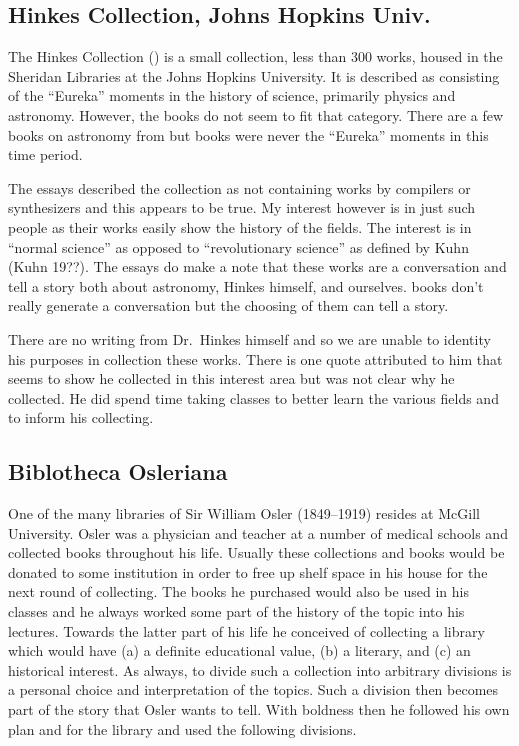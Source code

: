 \documentclass[letterpaper]{article}
\begin{document}
\subsection{Hinkes Collection, Johns Hopkins Univ.}

The Hinkes Collection (\cite{Havens2011}) is a small collection, less
than 300 works, housed in the Sheridan Libraries at the Johns Hopkins
University. It is described as consisting of the ``Eureka'' moments in
the history of science, primarily physics and astronomy. However,
the  books do not seem to fit that category. There are a few
books on astronomy from  but books were never the ``Eureka''
moments in this time period.

The essays described the collection as not containing works by
compilers or synthesizers and this appears to be true.  My interest
however is in just such people as their works easily show the history
of the fields.  The interest is in ``normal science'' as opposed to
``revolutionary science'' as defined by Kuhn (Kuhn 19??). The essays
do make a note that these works are a conversation and tell a story
both about astronomy, Hinkes himself, and ourselves.   books
don't really generate a conversation but the choosing of them can
tell a story.

There are no writing from Dr.~Hinkes himself and so we are unable to
identity his purposes in collection these works.  There is one quote
attributed to him that seems to show he collected in this interest
area but was not clear why he collected.  He did spend time taking
classes to better learn the various fields and to inform his
collecting.


\subsection{Biblotheca Osleriana}

One of the many libraries of Sir William Osler (1849--1919) resides at
McGill University.  Osler was a physician and teacher at a number of
medical schools and collected books throughout his life.  Usually
these collections and books would be donated to some institution in
order to free up shelf space in his house for the next round of
collecting.  The books he purchased would also be used in his classes
and he always worked some part of the history of the topic into his
lectures.  Towards the latter part of his life he conceived of
collecting a library which would have (a) a definite educational
value, (b) a literary, and (c) an historical interest. As always, to
divide such a collection into arbitrary divisions is a personal choice
and interpretation of the topics.  Such a division then becomes part
of the story that Osler wants to tell.  With boldness then he followed
his own plan and for the library and used the following divisions.
\end{document}
